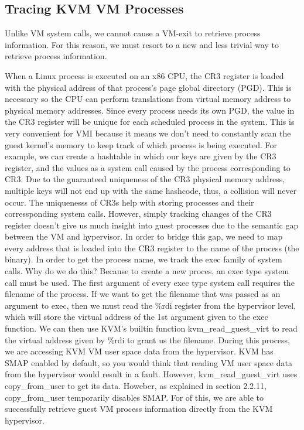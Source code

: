 \documentclass{report}
\begin{document}
\begin{spacing}{1.5}
\section{Tracing KVM VM Processes}

{\large
Unlike VM system calls, we cannot cause a VM-exit to retrieve process information. For this reason, we must resort to a new and less trivial way to retrieve process information.
\newline
}

{\large
When a Linux process is executed on an x86 CPU, the CR3 register is loaded with the physical address of that process's page global directory (PGD). This is necessary so the CPU can perform translations from virtual memory address to physical memory addresses. Since every process needs its own PGD, the value in the CR3 register will be unique for each scheduled process in the system. This is very convenient for VMI because it means we don't need to constantly scan the guest kernel's memory to keep track of which process is being executed. For example, we can create a hashtable in which our keys are given by the CR3 register, and the values as a system call caused by the process corresponding to CR3. Due to the guaranteed uniqueness of the CR3 physical memory address, multiple keys will not end up with the same hashcode, thus, a collision will never occur. The uniquenesss of CR3s help with storing processes and their corressponding system calls. However, simply tracking changes of the CR3 register doesn't give us much insight into guest processes due to the semantic gap between the VM and hypervisor. In order to bridge this gap, we need to map every address that is loaded into the CR3 register to the name of the process (the binary). In order to get the process name, we track the exec family of system calls. Why do we do this? Because to create a new proces, an exec type system call must be used. The first argument of every exec type system call requires the filename of the process. If we want to get the filename that was passed as an argument to exec, then we must read the \%rdi register from the hypervisor level, which will store the virtual address of the 1st argument given to the exec function. We can then use KVM's builtin function kvm\_read\_guest\_virt to read the virtual address given by \%rdi to grant us the filename. During this process, we are accessing KVM VM user space data from the hypervisor. KVM has SMAP enabled by default, so you would think that reading VM user space data from the hypervisor would result in a fault. However, kvm\_read\_guest\_virt uses copy\_from\_user to get its data. Howeber, as explained in section 2.2.11, copy\_from\_user temporarily disables SMAP. For of this, we are able to successfully retrieve guest VM process information directly from the KVM hypervisor.
\newline
}



\end{spacing}
\end{document}

